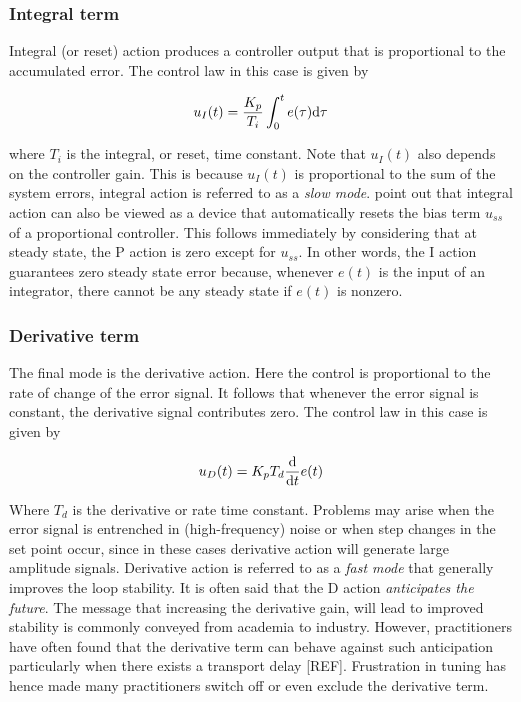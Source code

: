\subsubsection*{Integral term}

Integral (or reset) action produces a controller output that is proportional to the accumulated error. The control law in this case is given by

\[u_I( t ) = \frac{K_p}{T_i}\int_0^t e(\tau)\mathrm{d} \tau \]

\noindent where $T_i$ is the integral, or reset, time constant. Note that $u_I(t)$ also depends on the controller gain. This is because  $u_I(t)$ is proportional to the sum of the system errors, integral action is referred to as a \emph{slow mode}.\cite{astromhagglund2006} point out that integral action can also be viewed as a device that automatically resets the bias term $u_{ss}$ of a proportional controller. This follows immediately by considering that at steady state,  the P action is zero except for $u_{ss}$. In other words, the I action guarantees zero steady state error because, whenever $e(t)$ is the input of an integrator, there cannot be any steady state if $e(t)$ is nonzero.

\subsubsection*{Derivative term}

The final mode is the derivative  action. Here the control is proportional to the rate of change of the error signal. It follows that whenever the error signal is constant, the derivative signal contributes zero. The control law in this case is given by

\[u_D(t) = K_pT_d \frac{\mathrm{d}}{\mathrm{d} t}e(t)\]

Where $T_d$ is the derivative or rate time constant. Problems may arise when the error signal is entrenched in (high-frequency) noise or when step changes in the set point occur, since in these cases derivative action will generate large amplitude signals. Derivative action is referred to as a \emph{fast mode} that generally improves the loop stability. It is often said that the D action \emph{anticipates the future}. The message that increasing the derivative gain, will lead to improved stability is commonly conveyed from academia to industry. However, practitioners have often found that the derivative term can behave against such anticipation particularly when there exists a transport delay [REF]. Frustration in tuning  has hence made many practitioners switch off or even exclude the derivative term.  


